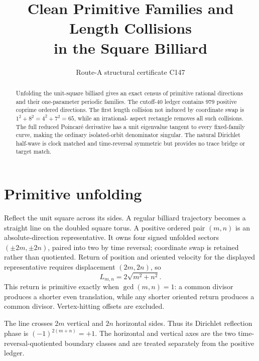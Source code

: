 \documentclass[10pt]{article}
\title{Clean Primitive Families and Length Collisions\\
in the Square Billiard}
\author{Route-A structural certificate C147}
\date{}
\begin{document}
\maketitle

\begin{abstract}
Unfolding the unit-square billiard gives an exact census of primitive rational
directions and their one-parameter periodic families.  The cutoff-$40$ ledger
contains 979 positive coprime ordered directions.  The first length collision
not induced by coordinate swap is $1^2+8^2=4^2+7^2=65$, while an irrational-
aspect rectangle removes all such collisions.  The full reduced Poincar\'e
derivative has a unit eigenvalue tangent to every fixed-family curve, making
the ordinary isolated-orbit denominator singular.  The natural Dirichlet
half-wave is clock matched and time-reversal symmetric but provides no trace
bridge or target match.
\end{abstract}

\section{Primitive unfolding}
Reflect the unit square across its sides.  A regular billiard trajectory becomes
a straight line on the doubled square torus.  A positive ordered pair $(m,n)$
is an absolute-direction representative.  It owns four signed unfolded
sectors $(\pm2m,\pm2n)$, paired into two by time reversal; coordinate swap is
retained rather than quotiented.  Return of position and oriented velocity for
the displayed representative requires displacement $(2m,2n)$, so
\begin{equation}
L_{m,n}=2\sqrt{m^2+n^2}.                         \tag{1}
\end{equation}
This return is primitive exactly when $\gcd(m,n)=1$: a common divisor produces
a shorter even translation, while any shorter oriented return produces a
common divisor.  Vertex-hitting offsets are excluded.

The line crosses $2m$ vertical and $2n$ horizontal sides.  Thus its Dirichlet
reflection phase is $(-1)^{2(m+n)}=+1$.  The horizontal and vertical axes are
the two time-reversal-quotiented boundary classes and are treated separately
from the positive ledger.
\end{document}
